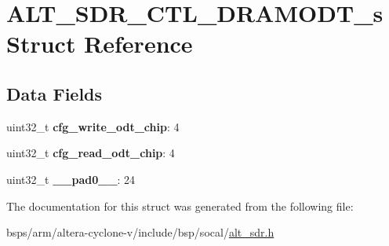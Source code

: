 \hypertarget{structALT__SDR__CTL__DRAMODT__s}{}\section{A\+L\+T\+\_\+\+S\+D\+R\+\_\+\+C\+T\+L\+\_\+\+D\+R\+A\+M\+O\+D\+T\+\_\+s Struct Reference}
\label{structALT__SDR__CTL__DRAMODT__s}
\subsection*{Data Fields}
\begin{DoxyCompactItemize}
\item 
\mbox{\label{structALT__SDR__CTL__DRAMODT__s_ad6da2f3a40015073a14efad40be1b4c5}} 
uint32\+\_\+t {\bfseries cfg\+\_\+write\+\_\+odt\+\_\+chip}\+: 4
\item 
\mbox{\label{structALT__SDR__CTL__DRAMODT__s_a5741baf3c9e305da9c0f2bacde55da52}} 
uint32\+\_\+t {\bfseries cfg\+\_\+read\+\_\+odt\+\_\+chip}\+: 4
\item 
\mbox{\label{structALT__SDR__CTL__DRAMODT__s_ad7a0c300f9dc80c068635f0cfbcbde23}} 
uint32\+\_\+t {\bfseries \+\_\+\+\_\+pad0\+\_\+\+\_\+}\+: 24
\end{DoxyCompactItemize}


The documentation for this struct was generated from the following file\+:\begin{DoxyCompactItemize}
\item 
bsps/arm/altera-\/cyclone-\/v/include/bsp/socal/\mbox{\hyperlink{alt__sdr_8h}{alt\+\_\+sdr.\+h}}\end{DoxyCompactItemize}
